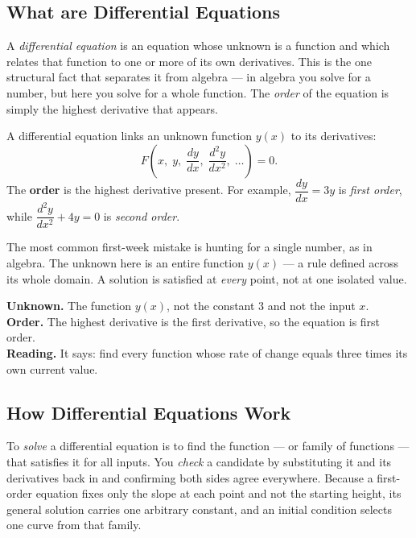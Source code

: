 \documentclass[11pt]{article}
\begin{document}
\subsection{What are Differential Equations}

A \emph{differential equation} is an equation whose unknown is a function and
which relates that function to one or more of its own derivatives. This is the
one structural fact that separates it from algebra --- in algebra you solve for
a number, but here you solve for a whole function. The \emph{order} of the
equation is simply the highest derivative that appears.

\begin{formulabox}
A differential equation links an unknown function $y(x)$ to its derivatives:
\[
    F\!\left(x,\; y,\; \frac{dy}{dx},\; \frac{d^{2}y}{dx^{2}},\; \dots\right) = 0.
\]
The \textbf{order} is the highest derivative present. For example,
$\dfrac{dy}{dx} = 3y$ is \emph{first order}, while $\dfrac{d^{2}y}{dx^{2}} + 4y = 0$
is \emph{second order}.
\end{formulabox}

\begin{warningbox}
The most common first-week mistake is hunting for a single number, as in
algebra. The unknown here is an entire function $y(x)$ --- a rule defined across
its whole domain. A solution is satisfied at \emph{every} point, not at one
isolated value.
\end{warningbox}

\begin{examplebox}[Worked Example 0.1: Read $\frac{dy}{dx} = 3y$]
\textbf{Unknown.} The function $y(x)$, not the constant $3$ and not the input $x$.\\
\textbf{Order.} The highest derivative is the first derivative, so the equation
is first order.\\
\textbf{Reading.} It says: find every function whose rate of change equals three
times its own current value.
\end{examplebox}

\subsection{How Differential Equations Work}

To \emph{solve} a differential equation is to find the function --- or family of
functions --- that satisfies it for all inputs. You \emph{check} a candidate by
substituting it and its derivatives back in and confirming both sides agree
everywhere. Because a first-order equation fixes only the slope at each point
and not the starting height, its general solution carries one arbitrary
constant, and an initial condition selects one curve from that family.
\end{document}
